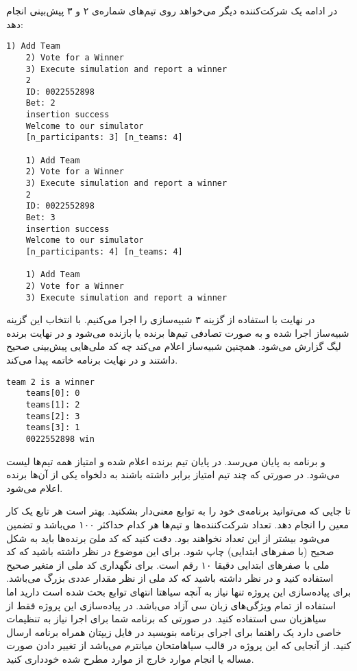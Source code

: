 \documentclass[../main.tex]{subfiles}
\begin{document}
در ادامه یک شرکت‌کننده دیگر می‌خواهد روی تیم‌های شماره‌ی ۲ و ۳ پیش‌بینی انجام دهد:

\begin{latin}
\begin{lstlisting}[]
    1) Add Team
    2) Vote for a Winner
    3) Execute simulation and report a winner
    2
    ID: 0022552898
    Bet: 2
    insertion success
    Welcome to our simulator
    [n_participants: 3] [n_teams: 4]

    1) Add Team
    2) Vote for a Winner
    3) Execute simulation and report a winner
    2
    ID: 0022552898
    Bet: 3
    insertion success
    Welcome to our simulator
    [n_participants: 4] [n_teams: 4]

    1) Add Team
    2) Vote for a Winner
    3) Execute simulation and report a winner
\end{lstlisting}
\end{latin}

در نهایت با استفاده از گزینه ۳ شبیه‌سازی را اجرا می‌کنیم.
با انتخاب این گزینه شبیه‌ساز اجرا شده و به صورت تصادفی تیم‌ها برنده یا بازنده می‌شود
و در نهایت برنده لیگ گزارش می‌شود. همچنین شبیه‌ساز اعلام می‌کند چه کد ملی‌هایی پیش‌بینی صحیح داشتند
و در نهایت برنامه خاتمه پیدا می‌کند.

\begin{latin}
\begin{lstlisting}[]
    team 2 is a winner
    teams[0]: 0
    teams[1]: 2
    teams[2]: 3
    teams[3]: 1
    0022552898 win
\end{lstlisting}
\end{latin}

و برنامه به پایان می‌رسد. در پایان تیم برنده اعلام شده و امتیاز همه تیم‌ها لیست می‌شود. در صورتی که چند تیم امتیاز برابر داشته باشند به دلخواه یکی از آن‌ها برنده اعلام می‌شود.


     تا جایی که می‌توانید برنامه‌ی خود را به توابع معنی‌دار بشکنید. بهتر است هر تابع یک کار معین را انجام دهد.
     تعداد شرکت‌کننده‌ها و تیم‌ها هر کدام حداکثر ۱۰۰ می‌باشد و تضمین می‌شود بیشتر از این تعداد نخواهند بود.
     دقت کنید که کد ملیَ برنده‌ها باید به شکل صحیح (با صفرهای ابتدایی) چاپ شود. برای این موضوع در نظر داشته باشید که کد ملی با صفرهای ابتدایی دقیقا ۱۰ رقم است.
     برای نگهداری کد ملی از متغیر صحیح استفاده کنید و در نظر داشته باشید که کد ملی از نظر مقدار عددی بزرگ می‌باشد.
     برای پیاده‌سازی این پروژه تنها نیاز به آنچه ‌سیاه{تا انتهای توابع} بحث شده است دارید اما استفاده از تمام ویژگی‌های زبان سی آزاد می‌باشد.
     در پیاده‌سازی این پروژه فقط از ‌سیاه{زبان سی} استفاده کنید. در صورتی که برنامه شما برای اجرا نیاز به تنظیمات خاصی دارد یک راهنما برای اجرای برنامه بنویسید در فایل زیپتان همراه برنامه ارسال کنید.
     از آنجایی که این پروژه در قالب ‌سیاه{امتحان میانترم} می‌باشد از تغییر دادن صورت مساله یا انجام موارد خارج از موارد مطرح شده خودداری کنید.
\end{document}
